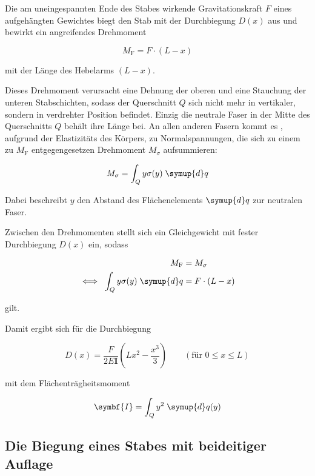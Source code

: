 Die am uneingespannten Ende des Stabes wirkende Gravitationskraft $F$ eines 
aufgehängten Gewichtes biegt den Stab mit der Durchbiegung $D(x)$ aus und
bewirkt ein angreifendes Drehmoment

\begin{equation}
    M_\text{F} = F \cdot (L - x)
\end{equation}

mit der Länge des Hebelarms $(L - x)$.

Dieses Drehmoment verursacht eine Dehnung der oberen und eine Stauchung
der unteren Stabschichten, sodass der Querschnitt $Q$ sich nicht mehr in vertikaler,
sondern in verdrehter Position befindet. Einzig die neutrale Faser in der Mitte
des Querschnitts $Q$ behält ihre Länge bei. An allen anderen Fasern kommt es ,
aufgrund der Elastizitäts des Körpers, zu Normalspannungen, die sich zu einem
zu $M_\text{F}$ entgegengesetzen Drehmoment $M_\sigma$ aufsummieren:

\begin{equation}
    M_\sigma = \int_Q y \sigma(y) \; \symup{d}q
\end{equation}

Dabei beschreibt $y$ den Abstand des Flächenelements $\symup{d}q$ zur neutralen Faser.

Zwischen den Drehmomenten stellt sich ein Gleichgewicht mit fester
Durchbiegung $D(x)$ ein, sodass 

\begin{align}
    M_\text{F} &= M_\sigma \\
    \iff \; \int_Q y \sigma(y) \; \symup{d}q &= F \cdot (L - x)
\end{align}

gilt.

Damit ergibt sich für die Durchbiegung

\begin{equation}
    D(x) = \frac{F}{2 E \symbf{I}} \left(L x^2 - \frac{x^3}{3} \right) 
    \qquad (\text{für } 0 \leq x \leq L)
\end{equation}

mit dem Flächenträgheitsmoment

\begin{equation}
    \symbf{I} = \int_Q y^2 \; \symup{d} q(y)
\end{equation}

\subsection{Die Biegung eines Stabes mit beideitiger Auflage}

